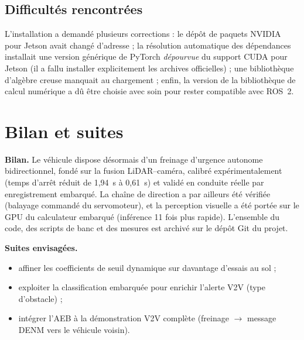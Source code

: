 \documentclass[11pt,a4paper]{article}
\begin{document}
\subsection{Difficultés rencontrées}
L'installation a demandé plusieurs corrections : le dépôt de paquets NVIDIA pour
Jetson avait changé d'adresse ; la résolution automatique des dépendances installait
une version générique de PyTorch \emph{dépourvue} du support CUDA pour Jetson (il a
fallu installer explicitement les archives officielles) ; une bibliothèque
d'algèbre creuse manquait au chargement ; enfin, la version de la bibliothèque de
calcul numérique a dû être choisie avec soin pour rester compatible avec ROS~2.

\section{Bilan et suites}
\textbf{Bilan.} Le véhicule dispose désormais d'un freinage d'urgence autonome
bidirectionnel, fondé sur la fusion LiDAR--caméra, calibré expérimentalement
(temps d'arrêt réduit de 1,94~s à 0,61~s) et validé en conduite réelle par
enregistrement embarqué. La chaîne de direction a par ailleurs été vérifiée
(balayage commandé du servomoteur), et la perception visuelle a été portée sur le
GPU du calculateur embarqué (inférence 11 fois plus rapide). L'ensemble du code, des scripts de banc et des mesures est
archivé sur le dépôt Git du projet.

\textbf{Suites envisagées.}
\begin{itemize}[leftmargin=1.4em,itemsep=1pt]
  \item affiner les coefficients de seuil dynamique sur davantage d'essais au sol ;
  \item exploiter la classification embarquée pour enrichir l'alerte V2V (type d'obstacle) ;
  \item intégrer l'AEB à la démonstration V2V complète (freinage $\rightarrow$ message
        DENM vers le véhicule voisin).
\end{itemize}
\end{document}
